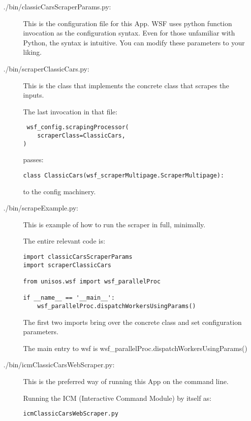 \documentclass{article}
\begin{document}
\begin{description}
  \item[./bin/classicCarsScraperParams.py:]
        This is the configuration file for this App.
        WSF uses python function invocation as the configuration syntax.
        Even for those unfamiliar with Python, the syntax is intuitive.
        You can modify these parameters to your liking.

  \item[./bin/scraperClassicCars.py:]
        This is the class that implements the concrete class that scrapes the inputs.

        The last invocation in that file:


\begin{verbatim}
 wsf_config.scrapingProcessor(
    scraperClass=ClassicCars,
)
\end{verbatim}

        passes:

\begin{verbatim}
class ClassicCars(wsf_scraperMultipage.ScraperMultipage):
\end{verbatim}

        to the config machinery.

  \item[./bin/scrapeExample.py:]
        This is example of how to run the scraper in full, minimally.

        The entire relevant code is:

\begin{verbatim}
import classicCarsScraperParams
import scraperClassicCars

from unisos.wsf import wsf_parallelProc

if __name__ == '__main__':
    wsf_parallelProc.dispatchWorkersUsingParams()
\end{verbatim}

        The first two imports bring over the concrete class and set configuration parameters.

        The main entry to wsf is wsf\_parallelProc.dispatchWorkersUsingParams()

  \item[./bin/icmClassicCarsWebScraper.py:]
        This is the preferred way of running this App on the command line.

        Running the ICM (Interactive Command Module) by itself as:
\begin{verbatim}
icmClassicCarsWebScraper.py
\end{verbatim}


\end{description}
\end{document}
